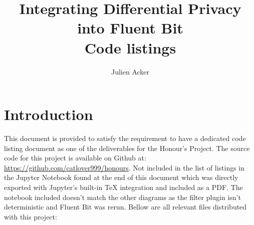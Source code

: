 \documentclass[a4paper]{article}
\title{Integrating Differential Privacy into Fluent Bit \\ \Large Code listings}
\author{Julien Acker}
\begin{document}
\maketitle

\section*{Introduction}

This document is provided to satisfy the requirement to have a dedicated code listing document as one of the deliverables for the Honour's Project. The source code for this project is available on Github at: \url{https://github.com/catlover999/honours}. Not included in the list of listings in the Jupyter Notebook found at the end of this document which was directly exported with Jupyter's built-in TeX integration and included as a PDF. The notebook included doesn't match the other diagrams as the filter plugin isn't deterministic and Fluent Bit was rerun. Bellow are all relevant files distributed with this project:

\lstlistoflistings


\end{document}
